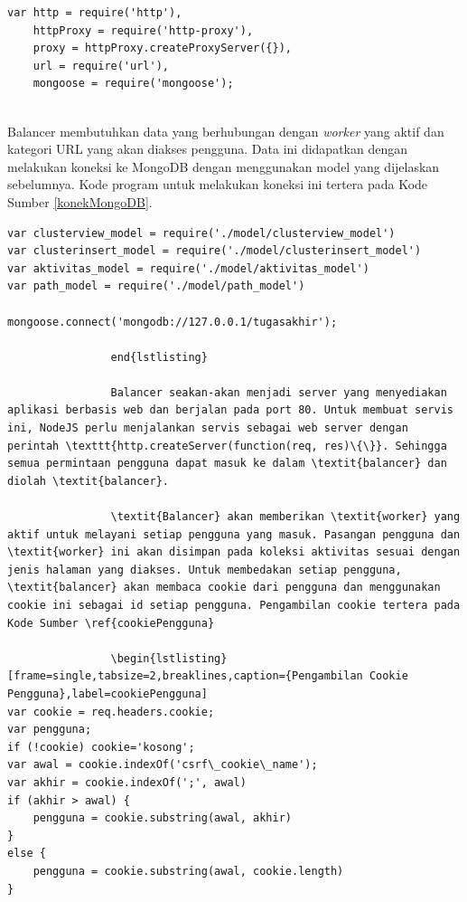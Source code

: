\documentclass{ta-its}
\begin{document}
				\begin{lstlisting}[frame=single,tabsize=2,breaklines,caption={Paket untuk Balancer},label=paketBalancer]
var http = require('http'),
	httpProxy = require('http-proxy'),
	proxy = httpProxy.createProxyServer({}),
	url = require('url'),
	mongoose = require('mongoose');
				
				\end{lstlisting}
				
				Balancer membutuhkan data yang berhubungan dengan \textit{worker} yang aktif dan kategori URL yang akan diakses pengguna. Data ini didapatkan dengan melakukan koneksi ke MongoDB dengan menggunakan model yang dijelaskan sebelumnya. Kode program untuk melakukan koneksi ini tertera pada Kode Sumber \ref{konekMongoDB}.
				
				\begin{lstlisting}[frame=single,tabsize=2,breaklines,caption={Koneksi Balancer ke MongoDB},label=konekMongoDB]
var clusterview_model = require('./model/clusterview_model')
var clusterinsert_model = require('./model/clusterinsert_model')
var aktivitas_model = require('./model/aktivitas_model')
var path_model = require('./model/path_model')

mongoose.connect('mongodb://127.0.0.1/tugasakhir');
				
				end{lstlisting}
				
				Balancer seakan-akan menjadi server yang menyediakan aplikasi berbasis web dan berjalan pada port 80. Untuk membuat servis ini, NodeJS perlu menjalankan servis sebagai web server dengan perintah \texttt{http.createServer(function(req, res)\{\}}. Sehingga semua permintaan pengguna dapat masuk ke dalam \textit{balancer} dan diolah \textit{balancer}.
				
				\textit{Balancer} akan memberikan \textit{worker} yang aktif untuk melayani setiap pengguna yang masuk. Pasangan pengguna dan \textit{worker} ini akan disimpan pada koleksi aktivitas sesuai dengan jenis halaman yang diakses. Untuk membedakan setiap pengguna, \textit{balancer} akan membaca cookie dari pengguna dan menggunakan cookie ini sebagai id setiap pengguna. Pengambilan cookie tertera pada Kode Sumber \ref{cookiePengguna}
				
				\begin{lstlisting}[frame=single,tabsize=2,breaklines,caption={Pengambilan Cookie Pengguna},label=cookiePengguna]
var cookie = req.headers.cookie;
var pengguna;
if (!cookie) cookie='kosong';
var awal = cookie.indexOf('csrf\_cookie\_name');
var akhir = cookie.indexOf(';', awal)
if (akhir > awal) {
	pengguna = cookie.substring(awal, akhir)
}
else {
	pengguna = cookie.substring(awal, cookie.length)
}

				
				\end{lstlisting}
				
\end{document}
